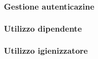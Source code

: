 \subsubsection{Gestione autenticazine}\label{sec:GestioneAutenticazineM}


\subsubsection{Utilizzo dipendente}\label{sec:Dipendente}


\subsubsection{Utilizzo igienizzatore}\label{sec:Igienizzatore}

